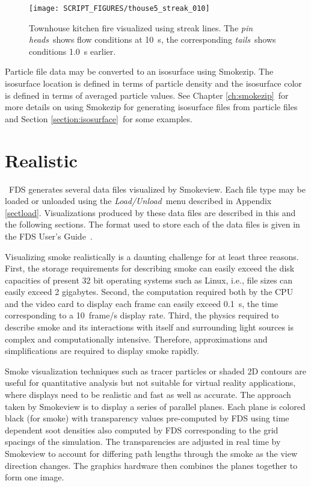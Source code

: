 \documentclass[11pt,twoside]{book}
\begin{document}
\begin{figure}[bph]
\begin{center}
\texttt{[image: SCRIPT\_FIGURES/thouse5\_streak\_010]}
\end{center}

\caption{Townhouse kitchen fire visualized using streak lines. The
{\em pin heads}\ shows flow conditions at 10~s, the corresponding
{\em tails}\ shows conditions 1.0~s earlier.}
\label{figstreak}%
\end{figure}

Particle file data may be converted to an isosurface using
Smokezip.  The isosurface location is defined in terms of particle
density and the isosurface color is defined in terms of averaged
particle values. See  Chapter \ref{ch:smokezip}\ for more details
on using Smokezip for generating isosurface files from particle
files and Section \ref{section:isosurface}\ for some examples.

\section{Realistic}
\label{section:volsmoke}\ FDS generates several data files
visualized by Smokeview. Each file type may be loaded or unloaded
using the {\em Load/Unload}\ menu described in Appendix
\ref{sectload}. Visualizations produced by these data files are
described in this and the following sections. The format used to
store each of the data files is given in the FDS User's
Guide~\cite{FDS_Users_Guide}.

Visualizing smoke realistically is a daunting challenge for at
least three reasons. First, the storage requirements for
describing smoke can easily exceed the disk capacities of present
32 bit operating systems such as Linux, i.e., file sizes can easily
exceed 2 gigabytes. Second, the computation required both by the
CPU and the video card to display each frame can easily exceed
0.1~s, the time corresponding to a 10~frame/s display rate. Third,
the physics required to describe smoke and its interactions with
itself and surrounding light sources is complex and
computationally intensive. Therefore, approximations and
simplifications are required to display smoke rapidly.

Smoke visualization techniques such as tracer particles or shaded
2D contours are useful for quantitative analysis but not suitable
for virtual reality applications, where displays need to be
realistic and fast as well as accurate. The approach taken by
Smokeview is to display a series of parallel planes.  Each plane
is colored black (for smoke) with transparency values pre-computed
by FDS using time dependent soot densities also computed by FDS
corresponding to the grid spacings of the simulation. The
transparencies are adjusted in real time by Smokeview to account
for differing path lengths through the smoke as the view direction
changes. The graphics hardware then combines the planes together
to form one image.
\end{document}
